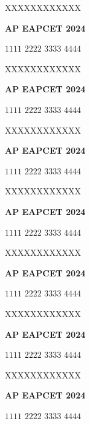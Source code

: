 \documentclass[11pt,paper=a4,answers]{exam}
\begin{document}
\begin{multicols}{2}
\begin{questions}
\question
XXXXXXXXXXXX
\begin{flushright}
\small\textbf{AP EAPCET 2024}
\end{flushright}
\begin{choices}
  \choice $1111$
  \choice $2222$ 
  \choice $3333$ 
  \choice $4444$
\end{choices}

\question
XXXXXXXXXXXX
\begin{flushright}
\small\textbf{AP EAPCET 2024}
\end{flushright}
\begin{choices}
  \choice $1111$
  \choice $2222$ 
  \choice $3333$ 
  \choice $4444$
\end{choices}

\question
XXXXXXXXXXXX
\begin{flushright}
\small\textbf{AP EAPCET 2024}
\end{flushright}
\begin{choices}
  \choice $1111$
  \choice $2222$ 
  \choice $3333$ 
  \choice $4444$
\end{choices}


\question
XXXXXXXXXXXX
\begin{flushright}
\small\textbf{AP EAPCET 2024}
\end{flushright}
\begin{choices}
  \choice $1111$
  \choice $2222$ 
  \choice $3333$ 
  \choice $4444$
\end{choices}

\question
XXXXXXXXXXXX
\begin{flushright}
\small\textbf{AP EAPCET 2024}
\end{flushright}
\begin{choices}
  \choice $1111$
  \choice $2222$ 
  \choice $3333$ 
  \choice $4444$
\end{choices}

\question
XXXXXXXXXXXX
\begin{flushright}
\small\textbf{AP EAPCET 2024}
\end{flushright}
\begin{choices}
  \choice $1111$
  \choice $2222$ 
  \choice $3333$ 
  \choice $4444$
\end{choices}

\question
XXXXXXXXXXXX
\begin{flushright}
\small\textbf{AP EAPCET 2024}
\end{flushright}
\begin{choices}
  \choice $1111$
  \choice $2222$ 
  \choice $3333$ 
  \choice $4444$
\end{choices}


\end{questions}
\end{multicols}
\end{document}
